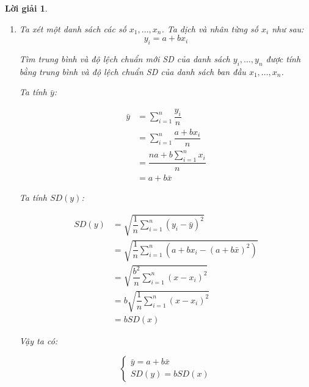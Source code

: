 \documentclass[14pt, a4paper]{article}
\theoremstyle{sltheorem}
\theoremstyle{soltheorem}
\newtheorem*{loigiai}{Lời giải}
\begin{document}
\begin{loigiai}
\begin{enumerate}[wide, labelwidth=!, labelindent=0pt,label=\textbf{\arabic*}.]
        Ta có cân nặng trung bình trong đơn vị ounces là: $3180\times 0.035=111.3$ (ounces) và độ lệch chuẩn SD trong đơn vị ounces là: $500 \times 0.035=17.5$ (ounces).
        
        \item Ta xét một danh sách các số $x_1, \dots, x_n$. Ta dịch và nhân từng số $x_i$ như sau:
        \begin{equation*}
            y_i = a + b x_i
        \end{equation*}

        Tìm trung bình và độ lệch chuẩn mới SD của danh sách $y_i, \dots, y_n$ được tính bằng trung bình và độ lệch chuẩn SD của danh sách ban đầu $x_1, \dots, x_n$.

        Ta tính $\bar{y}$:

        \begin{equation*}
            \begin{aligned}
                \bar{y} &= \sum_{i=1}^n \dfrac{y_i}{n} \\
                &= \sum_{i=1}^n \dfrac{a + b x_i}{n} \\
                &= \dfrac{na + b \sum_{i=1}^n x_i}{n} \\
                &= a + b \bar{x}
            \end{aligned}    
        \end{equation*}

        Ta tính $SD(y)$:

        \begin{equation*}
            \begin{aligned}
                SD(y) &= \sqrt{\dfrac{1}{n}\sum_{i=1}^n (y_i - \bar{y})^2} \\
                &= \sqrt{\dfrac{1}{n} \sum_{i=1}^n (a + b x_i - (a + b \bar{x})^2)} \\
                &= \sqrt{\dfrac{b^2}{n} \sum_{i=1}^n (x - x_i)^2} \\
                &= b \sqrt{\dfrac{1}{n}\sum_{i=1}^n (x - x_i)^2} \\
                &= b SD(x)
            \end{aligned}
        \end{equation*}

        Vậy ta có:

        \begin{equation*}
            \begin{cases}
                \bar{y} = a + b \bar{x} \\
                SD(y) = b SD(x)
            \end{cases}
        \end{equation*}


\end{enumerate}
\end{loigiai}
\end{document}
